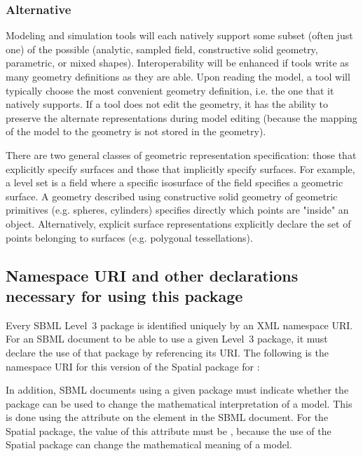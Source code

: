 \subsubsection{Alternative \GeometryDefinitions}
Modeling and simulation tools will each natively support some subset (often just one) of the possible \GeometryDefinitions (analytic, sampled field, constructive solid geometry, parametric, or mixed shapes).  Interoperability will be enhanced if tools write as many geometry definitions as they are able.  Upon reading the model, a tool will typically choose the most convenient geometry definition, i.e. the one that it natively supports.  If a tool does not edit the geometry, it has the ability to preserve the alternate representations during model editing (because the mapping of the model to the geometry is not stored in the geometry).

There are two general classes of geometric representation specification: those that explicitly specify surfaces and those that implicitly specify surfaces.  For example, a level set is a field where a specific isosurface of the field specifies a geometric surface.  A geometry described using constructive solid geometry of geometric primitives (e.g. spheres, cylinders) specifies directly which points are "inside" an object.  Alternatively, explicit surface representations explicitly declare the set of points belonging to surfaces (e.g. polygonal tessellations).



\subsection{Namespace URI and other declarations necessary for using this package}
\label{xml-namespace}
Every SBML Level~3 package is identified uniquely by an XML namespace URI.  For an SBML document to be able to use a given Level~3 package, it must declare the use of that package by referencing its URI.  The following is the namespace URI for this version of the Spatial package for \sbmlthreecore:
\begin{center}
\end{center}

In addition, SBML documents using a given package must indicate whether the package can be used to change the mathematical interpretation of a model.  This is done using the attribute  on the  element in the SBML document.  For the Spatial package, the value of this attribute must be , because the use of the Spatial package can change the mathematical meaning of a model.

